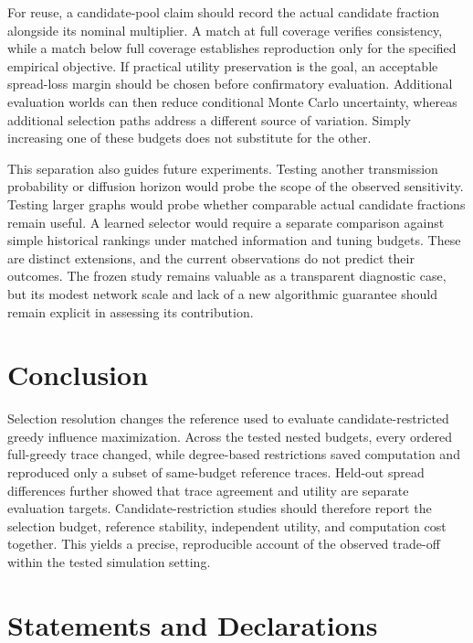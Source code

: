 \documentclass[smallextended]{svjour3}
\begin{document}
For reuse, a candidate-pool claim should record the actual candidate fraction alongside its nominal multiplier. A match at full coverage verifies consistency, while a match below full coverage establishes reproduction only for the specified empirical objective. If practical utility preservation is the goal, an acceptable spread-loss margin should be chosen before confirmatory evaluation. Additional evaluation worlds can then reduce conditional Monte Carlo uncertainty, whereas additional selection paths address a different source of variation. Simply increasing one of these budgets does not substitute for the other.

This separation also guides future experiments. Testing another transmission probability or diffusion horizon would probe the scope of the observed sensitivity. Testing larger graphs would probe whether comparable actual candidate fractions remain useful. A learned selector would require a separate comparison against simple historical rankings under matched information and tuning budgets. These are distinct extensions, and the current observations do not predict their outcomes. The frozen study remains valuable as a transparent diagnostic case, but its modest network scale and lack of a new algorithmic guarantee should remain explicit in assessing its contribution.

\FloatBarrier


\section{Conclusion}

Selection resolution changes the reference used to evaluate candidate-restricted greedy influence maximization. Across the tested nested budgets, every ordered full-greedy trace changed, while degree-based restrictions saved computation and reproduced only a subset of same-budget reference traces. Held-out spread differences further showed that trace agreement and utility are separate evaluation targets. Candidate-restriction studies should therefore report the selection budget, reference stability, independent utility, and computation cost together. This yields a precise, reproducible account of the observed trade-off within the tested simulation setting.


\section*{Statements and Declarations}
\end{document}
